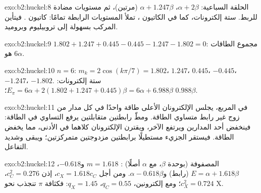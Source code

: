 \begin{solution}{exo:b2:huckel:8}
الحلقة السباعية: $\alpha + 2\beta$، $\alpha + 1.247\beta$ (مرتين)، ثم مستويات مضادة للربط. ستة
إلكترونات، كما في الكاتيون ، تملأ المستويات الرابطة تمامًا: كاتيون
. فيتأين المركب بسهولة إلى تروبيليوم وبروميد.
\end{solution}

\begin{solution}{exo:b2:huckel:9}
$1.802 + 1.247 + 0.445 - 0.445 - 1.247 - 1.802 = 0$: مجموع الطاقات هو $6\alpha$.
\end{solution}

\begin{solution}{exo:b2:huckel:10}
$n = 6$: $m_k = 2\cos(k\pi/7) = 1.802$، $1.247$، $0.445$، $-0.445$، $-1.247$، $-1.802$. ستة
إلكترونات: $E_\pi = 6\alpha + 2(1.802 + 1.247 + 0.445)\beta = 6\alpha + 6.988\beta$؛
 $0.988\beta$.
\end{solution}

\begin{solution}{exo:b2:huckel:11}
في المربع، يجلس الإلكترونان الأعلى طاقة واحدًا في كل مدار من زوج
غير رابط متساوي الطاقة. ومطّ رابطتين متقابلتين يرفع التساوي في الطاقة:
فينخفض أحد المدارين ويرتفع الآخر، ويقترن الإلكترونان كلاهما في الأدنى، مما
يخفض الطاقة. فيستقر الجزيء مستطيلًا برابطتين مزدوجتين
متمركزتين؛ ويبقى  وشديد التفاعل.
\end{solution}

\begin{solution}{exo:b2:huckel:12}
المصفوفة (بوحدة $\beta$، مع $\alpha$ أصلًا) :
$m = 1.618$ و$-0.618$، $E = \alpha + 1.618\beta$ (رابط) و$\alpha - 0.618\beta$. ومن أجل
 $c_X = 1.618c_C$، إذن $c_C^2 = 0.276$، $c_X^2 = 0.724$؛ ومع إلكترونين،
$q_C = 0.55$، $q_X = 1.45$: فكثافة $\pi$ تنجذب نحو X.
\end{solution}

